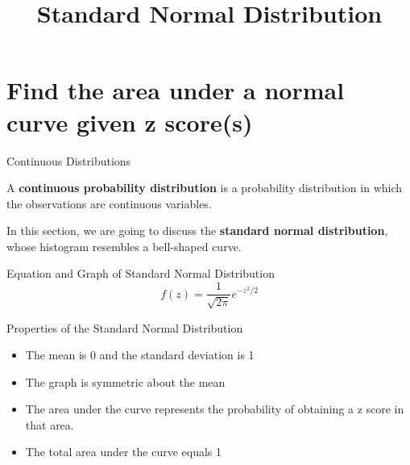 \documentclass[t]{beamer}
\title{Standard Normal Distribution}
\author{}
\date{}
\begin{document}

\begin{frame} 
\maketitle
\end{frame}

\section{Find the area under a normal curve given z score(s)}

\begin{frame}{Continuous Distributions}
\begin{tcolorbox}[colframe=green!20!black, colback = green!30!white,title=\textbf{Continuous Probability Distribution}]
A \textbf{continuous probability distribution} is a probability distribution in which the observations are continuous variables.
\end{tcolorbox}
\bigskip	\pause

In this section, we are going to discuss the {\color{blue}\textbf{standard normal distribution}}, whose histogram resembles a bell-shaped curve.
\end{frame}

\begin{frame}{Equation and Graph of Standard Normal Distribution}
\[f(z) = \frac{1}{\sqrt{2\pi}} e^{-z^2/2} \]	\smallskip
\begin{center}
\end{center}
\end{frame}

\begin{frame}{Properties of the Standard Normal Distribution}
\begin{itemize}
	\item<+-> The mean is 0 and the standard deviation is 1
	\item<+-> The graph is symmetric about the mean
	\item<+-> The area under the curve represents the probability of obtaining a z score in that area.
	\item<+-> The total area under the curve equals 1
\end{itemize}
\end{frame}
\end{document}
